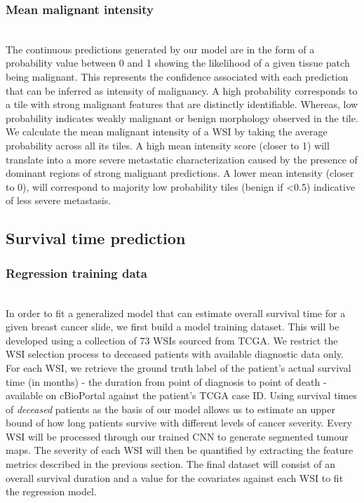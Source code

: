 \documentclass{l4proj}
\begin{document}
\subsubsection{Mean malignant intensity}
\hfill\\
The continuous predictions generated by our model are in the form of a probability value between 0 and 1 showing the likelihood of a given tissue patch being malignant. This represents the confidence  associated with each prediction that can be inferred as intensity of malignancy. A high probability corresponds to a tile with strong malignant features that are distinctly identifiable. Whereas, low probability indicates weakly malignant or benign morphology observed in the tile. We calculate the mean malignant intensity of a WSI by taking the average probability across all its tiles. A high mean intensity score (closer to 1) will translate into a more severe metastatic characterization caused by the presence of dominant regions of strong malignant predictions. A lower mean intensity (closer to 0), will correspond to majority low probability tiles (benign if <0.5) indicative of less severe metastasis. 

\subsection{Survival time prediction}
\subsubsection{Regression training data}
\hfill\\
In order to fit a generalized model that can estimate overall survival time for a given breast cancer slide, we first build a model training dataset. This will be developed using a collection of 73 WSIs sourced from TCGA. We restrict the WSI selection process to deceased patients with available diagnostic data only. For each WSI, we retrieve the ground truth label of the patient's actual survival time (in months) - the duration from point of diagnosis to point of death - available on cBioPortal against the patient's TCGA case ID. Using survival times of \textit{deceased} patients as the basis of our model allows us to estimate an upper bound of how long patients survive with different levels of cancer severity. Every WSI will be processed through our trained CNN to generate segmented tumour maps. The severity of each WSI will then be quantified by extracting the feature metrics described in the previous section. The final dataset will consist of an overall survival duration and a value for the covariates against each WSI to fit the regression model. \\
\end{document}
